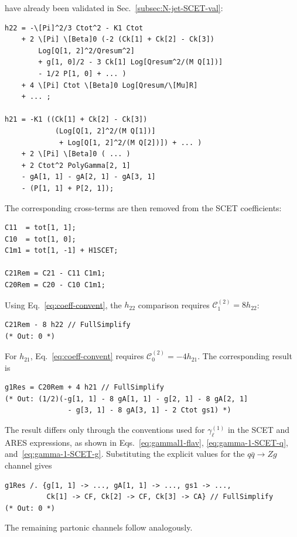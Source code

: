have already been validated in Sec.~\ref{subsec:N-jet-SCET-val}:
\begin{lstlisting}[style=mma, caption={Implementation of $h_{22}$ and
$h_{21}$ with the cross-terms omitted.}]
h22 = -\[Pi]^2/3 Ctot^2 - K1 Ctot
    + 2 \[Pi] \[Beta]0 (-2 (Ck[1] + Ck[2] - Ck[3])
        Log[Q[1, 2]^2/Qresum^2]
        + g[1, 0]/2 - 3 Ck[1] Log[Qresum^2/(M Q[1])]
        - 1/2 P[1, 0] + ... )
    + 4 \[Pi] Ctot \[Beta]0 Log[Qresum/\[Mu]R]
    + ... ;

h21 = -K1 ((Ck[1] + Ck[2] - Ck[3])
            (Log[Q[1, 2]^2/(M Q[1])]
             + Log[Q[1, 2]^2/(M Q[2])]) + ... )
    + 2 \[Pi] \[Beta]0 ( ... )
    + 2 Ctot^2 PolyGamma[2, 1]
    - gA[1, 1] - gA[2, 1] - gA[3, 1]
    - (P[1, 1] + P[2, 1]);
\end{lstlisting}
The corresponding cross-terms are then removed from the SCET coefficients:
\begin{lstlisting}[style=mma, caption={SCET coefficients with the
cross-terms omitted.}]
C11  = tot[1, 1];
C10  = tot[1, 0];
C1m1 = tot[1, -1] + H1SCET;

C21Rem = C21 - C11 C1m1;
C20Rem = C20 - C10 C1m1;
\end{lstlisting}
Using Eq.~\eqref{eq:coeff-convent}, the $h_{22}$ comparison requires
$\mathcal{C}^{(2)}_1=8h_{22}$:
\begin{lstlisting}[style=mma, caption={Validation of $h_{22}$.}]
C21Rem - 8 h22 // FullSimplify
(* Out: 0 *)
\end{lstlisting}
For $h_{21}$, Eq.~\eqref{eq:coeff-convent} requires
$\mathcal{C}^{(2)}_0=-4h_{21}$. The corresponding result is
\begin{lstlisting}[style=mma, caption={Validation of $h_{21}$, leaving a
residual in $\gamma^{(1)}_\ell$.}]
g1Res = C20Rem + 4 h21 // FullSimplify 
(* Out: (1/2)(-g[1, 1] - 8 gA[1, 1] - g[2, 1] - 8 gA[2, 1]
               - g[3, 1] - 8 gA[3, 1] - 2 Ctot gs1) *)
\end{lstlisting}
The result differs only through the conventions used for $\gamma_{\ell}^{(1)}$ in the SCET 
and \textsc{ARES} expressions, as
shown in Eqs.~\eqref{eq:gammal1-flav},
\eqref{eq:gamma-1-SCET-q}, and~\eqref{eq:gamma-1-SCET-g}. Substituting
the explicit values for the $q\bar q\to Zg$ channel gives
\begin{lstlisting}[style=mma, caption={Evaluation of the residual for the
$q\bar q\to Zg$ channel.}]
g1Res /. {g[1, 1] -> ..., gA[1, 1] -> ..., gs1 -> ...,
          Ck[1] -> CF, Ck[2] -> CF, Ck[3] -> CA} // FullSimplify
(* Out: 0 *)
\end{lstlisting}
The remaining partonic channels follow analogously.